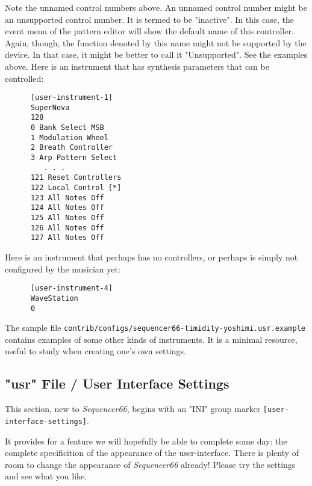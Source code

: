    Note the unnamed control numbers above.
   An unnamed control number might be an unsupported control number.
   It is termed to be "inactive".  In this case, the event menu of
   the pattern editor will show the default name of this controller.
   Again, though, the function denoted by this name might not be supported by
   the device.  In that case, it might be better to call it "Unsupported".
   See the examples above.
   Here is an instrument that has synthesis parameters that can be controlled:

   \begin{verbatim}
      [user-instrument-1]
      SuperNova
      128
      0 Bank Select MSB
      1 Modulation Wheel
      2 Breath Controller
      3 Arp Pattern Select
         . . .
      121 Reset Controllers
      122 Local Control [*]
      123 All Notes Off
      124 All Notes Off
      125 All Notes Off
      126 All Notes Off
      127 All Notes Off
   \end{verbatim}

   Here is an instrument that perhaps has no controllers, or perhaps is simply
   not configured by the musician yet:

   \begin{verbatim}
      [user-instrument-4]
      WaveStation
      0
   \end{verbatim}

   The sample file
   \texttt{contrib/configs/sequencer66-timidity-yoshimi.usr.example}
   contains examples of some other kinds of instruments.
   It is a minimal resource, useful to study when creating one's own settings.

\subsection{"usr" File / User Interface Settings}
\label{subsec:seq66_usr_file_user_interface_settings}

   This section, new to \textsl{Sequencer66}, begins with an
   "INI" group marker \texttt{[user-interface-settings]}.

   It provides for a feature we will hopefully be able to complete some day:
   the complete specificition of the appearance of the user-interface.
   There is plenty of room to change the appearance of
   \textsl{Sequencer66} already!  Please try the settings and see what you
   like.


